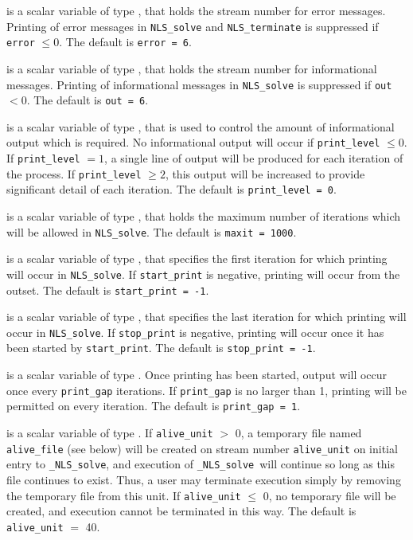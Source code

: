 \documentclass{galahad}
\newcommand{\packagename}{NLS}
\newcommand{\fullpackagename}{\libraryname\_\packagename}
\newcommand{\solver}{{\tt \fullpackagename\_solve}}
\begin{document}
\begin{description}

 is a scalar variable of type \integer, that holds the
stream number for error messages. Printing of error messages in
{\tt \packagename\_solve} and {\tt \packagename\_terminate}
is suppressed if {\tt error} $\leq 0$.
The default is {\tt error = 6}.

 is a scalar variable of type \integer, that holds the
stream number for informational messages. Printing of informational messages in
{\tt \packagename\_solve} is suppressed if {\tt out} $< 0$.
The default is {\tt out = 6}.

 is a scalar variable of type \integer, that is used
to control the amount of informational output which is required. No
informational output will occur if {\tt print\_level} $\leq 0$. If
{\tt print\_level} $= 1$, a single line of output will be produced for each
iteration of the process. If {\tt print\_level} $\geq 2$, this output will be
increased to provide significant detail of each iteration.
The default is {\tt print\_level = 0}.

 is a scalar variable of type \integer, that holds the
maximum number of iterations which will be allowed in {\tt \packagename\_solve}.
The default is {\tt maxit = 1000}.

 is a scalar variable of type \integer, that specifies
the first iteration for which printing will occur in {\tt \packagename\_solve}.
If {\tt start\_print} is negative, printing will occur from the outset.
The default is {\tt start\_print = -1}.

 is a scalar variable of type \integer, that specifies
the last iteration for which printing will occur in  {\tt \packagename\_solve}.
If {\tt stop\_print} is negative, printing will occur once it has been
started by {\tt start\_print}.
The default is {\tt stop\_print = -1}.

 is a scalar variable of type \integer.
Once printing has been started, output will occur once every
{\tt print\_gap} iterations. If {\tt print\_gap} is no larger than 1,
printing will be permitted on every iteration.
The default is {\tt print\_gap = 1}.

 is a scalar variable of type \integer.
If {\tt alive\_unit} $>$ 0, a temporary file named {\tt alive\_file} (see below)
will be created on stream number {\tt alive\_unit} on initial entry to
\solver, and execution of \solver\ will continue so
long as this file continues to exist. Thus, a user may terminate execution
simply by removing the temporary file from this unit.
If {\tt alive\_unit} $\leq$ 0, no temporary file will be created, and
execution cannot be terminated in this way.
The default is {\tt alive\_unit} $=$ 40.


\end{description}
\end{document}
